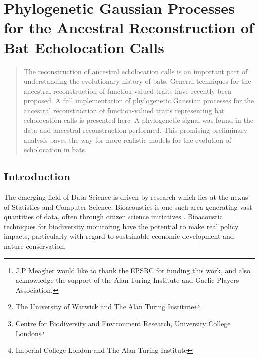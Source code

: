 \documentclass{ws-rv9x6}
\begin{document}
\chapter[Ancestral Reconstruction of Bat Echolocation Calls]{Phylogenetic Gaussian Processes for the Ancestral Reconstruction of Bat Echolocation Calls}\label{ra_ch1}

\author[J.P. Meagher \textit{et al.}]{J.P. Meagher\footnote{J.P Meagher would like to thank the EPSRC for funding this work, and also acknowledge the support of the Alan Turing Institute and Gaelic Players Association.}, T. Damoulas\footnote{The University of Warwick and The Alan Turing Institute}, K.E. Jones\footnote{Centre for Biodiversity and Environment Research, University College London}, and M. Girolami\footnote{Imperial College London and The Alan Turing Institute}\\}

\address{Department of Statistics,\\ The University of Warwick.\\
	J.Meagher@Warwick.ac.uk}

\begin{abstract}
The reconstruction of ancestral echolocation calls is an important part of understanding the evolutionary history of bats. General techniques for the ancestral reconstruction of function-valued traits have recently been proposed. A full implementation of phylogenetic Gaussian processes for the ancestral reconstruction of function-valued traits representing bat echolocation calls is presented here. A phylogenetic signal was found in the data and ancestral reconstruction performed. This promising preliminary analysis paves the way for more realistic models for the evolution of echolocation in bats.
\end{abstract}
\body

\section{Introduction}
\label{sec:intro}
The emerging field of Data Science is driven by research which lies at the nexus of Statistics and Computer Science. Bioacoustics is one such area generating vast quantities of data, often through citizen science initiatives \cite{pettorelli2013indicator}. Bioacoustic techniques for biodiversity monitoring \cite{stathopoulos2017bat} \cite{damoulas2010bayesian} have the potential to make real policy impacts, particularly with regard to sustainable economic development and nature conservation.
\end{document}

